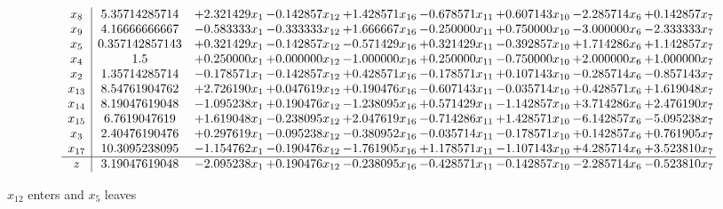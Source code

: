 \documentclass[10pt]{article}
\begin{document}
 \[\begin{array}{c| c c@{\hskip 2pt} c@{\hskip 2pt} c@{\hskip 2pt} c@{\hskip 2pt} c@{\hskip 2pt} c@{\hskip 2pt} c@{\hskip 2pt} }
 x_{8}   &  5.35714285714 & + 2.321429 x_{1} & -0.142857 x_{12} & + 1.428571 x_{16} & -0.678571 x_{11} & + 0.607143 x_{10} & -2.285714 x_{6} & + 0.142857 x_{7}\\
 x_{9}   &  4.16666666667 & -0.583333 x_{1} & -0.333333 x_{12} & + 1.666667 x_{16} & -0.250000 x_{11} & + 0.750000 x_{10} & -3.000000 x_{6} & -2.333333 x_{7}\\
 x_{5}   &  0.357142857143 & + 0.321429 x_{1} & -0.142857 x_{12} & -0.571429 x_{16} & + 0.321429 x_{11} & -0.392857 x_{10} & + 1.714286 x_{6} & + 1.142857 x_{7}\\
 x_{4}   &  1.5 & + 0.250000 x_{1} & + 0.000000 x_{12} & -1.000000 x_{16} & + 0.250000 x_{11} & -0.750000 x_{10} & + 2.000000 x_{6} & + 1.000000 x_{7}\\
 x_{2}   &  1.35714285714 & -0.178571 x_{1} & -0.142857 x_{12} & + 0.428571 x_{16} & -0.178571 x_{11} & + 0.107143 x_{10} & -0.285714 x_{6} & -0.857143 x_{7}\\
 x_{13}   &  8.54761904762 & + 2.726190 x_{1} & + 0.047619 x_{12} & + 0.190476 x_{16} & -0.607143 x_{11} & -0.035714 x_{10} & + 0.428571 x_{6} & + 1.619048 x_{7}\\
 x_{14}   &  8.19047619048 & -1.095238 x_{1} & + 0.190476 x_{12} & -1.238095 x_{16} & + 0.571429 x_{11} & -1.142857 x_{10} & + 3.714286 x_{6} & + 2.476190 x_{7}\\
 x_{15}   &  6.7619047619 & + 1.619048 x_{1} & -0.238095 x_{12} & + 2.047619 x_{16} & -0.714286 x_{11} & + 1.428571 x_{10} & -6.142857 x_{6} & -5.095238 x_{7}\\
 x_{3}   &  2.40476190476 & + 0.297619 x_{1} & -0.095238 x_{12} & -0.380952 x_{16} & -0.035714 x_{11} & -0.178571 x_{10} & + 0.142857 x_{6} & + 0.761905 x_{7}\\
 x_{17}   &  10.3095238095 & -1.154762 x_{1} & -0.190476 x_{12} & -1.761905 x_{16} & + 1.178571 x_{11} & -1.107143 x_{10} & + 4.285714 x_{6} & + 3.523810 x_{7}\\
\hline
z    &  3.19047619048 & -2.095238 x_{1} & + 0.190476 x_{12} & -0.238095 x_{16} & -0.428571 x_{11} & -0.142857 x_{10} & -2.285714 x_{6} & -0.523810 x_{7}\\
\end{array}\]


 $ x_{12} $ enters and $ x_{5} $ leaves 
\end{document}
